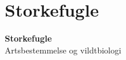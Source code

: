\section{Storkefugle}

\begin{frame}
  \vspace{3em}
  \begin{center}
    {\LARGE \textbf{Storkefugle}}
    \vspace{2em}
    \\ Artsbestemmelse og vildtbiologi
\par
{\normalsize }
\vspace{1em}
\par
  \end{center}
\end{frame}

